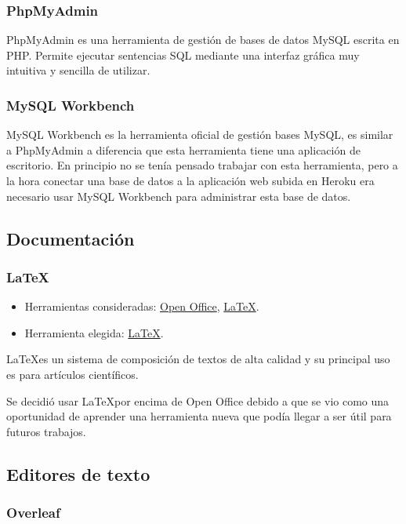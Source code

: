 \subsubsection{PhpMyAdmin}

PhpMyAdmin es una herramienta de gestión de bases de datos MySQL escrita en PHP. Permite ejecutar sentencias SQL mediante una interfaz gráfica muy intuitiva y sencilla de utilizar.


\subsubsection{MySQL Workbench}

MySQL Workbench es la herramienta oficial de gestión bases MySQL, es similar a PhpMyAdmin a diferencia que esta herramienta tiene una aplicación de escritorio. En principio no se tenía pensado trabajar con esta herramienta, pero a la hora conectar una base de datos a la aplicación web subida en Heroku era necesario usar MySQL Workbench para administrar esta base de datos.

\subsection{Documentación}

\subsubsection{\LaTeX}
\begin{itemize}
    \item Herramientas consideradas: \href{https://www.openoffice.org/es/}{Open Office}, \href{https://www.latex-project.org/}{\LaTeX}.
	\item Herramienta elegida: \href{https://www.latex-project.org/}{\LaTeX}.
\end{itemize}

\LaTeX es un sistema de composición de textos de alta calidad y su principal uso es para artículos científicos.

Se decidió usar \LaTeX por encima de Open Office debido a que se vio como una oportunidad de aprender una herramienta nueva que podía llegar a ser útil para futuros trabajos.

\subsection{Editores de texto}

\subsubsection{Overleaf}

